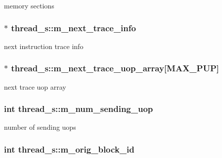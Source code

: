 \label{structthread__s_a34206b2835435191b813c943cf4d6c1b}
memory sections \hypertarget{structthread__s_a484d73110277c89a874cb1c681c916fc}{
\subsubsection[{m\_\-next\_\-trace\_\-info}]{$\ast$ {\bf thread\_\-s::m\_\-next\_\-trace\_\-info}}}
\label{structthread__s_a484d73110277c89a874cb1c681c916fc}
next instruction trace info \hypertarget{structthread__s_acb1122a59e5a61681b95987404c52789}{
\subsubsection[{m\_\-next\_\-trace\_\-uop\_\-array}]{$\ast$ {\bf thread\_\-s::m\_\-next\_\-trace\_\-uop\_\-array}\mbox{[}MAX\_\-PUP\mbox{]}}}
\label{structthread__s_acb1122a59e5a61681b95987404c52789}
next trace uop array \hypertarget{structthread__s_a7d27d154f05ae450db08ae51e576d2fd}{
\subsubsection[{m\_\-num\_\-sending\_\-uop}]{\setlength{\rightskip}{0pt plus 5cm}int {\bf thread\_\-s::m\_\-num\_\-sending\_\-uop}}}
\label{structthread__s_a7d27d154f05ae450db08ae51e576d2fd}
number of sending uops \hypertarget{structthread__s_af58128f3c139ab946d96c1b453c0708a}{
\subsubsection[{m\_\-orig\_\-block\_\-id}]{\setlength{\rightskip}{0pt plus 5cm}int {\bf thread\_\-s::m\_\-orig\_\-block\_\-id}}}
\label{structthread__s_af58128f3c139ab946d96c1b453c0708a}
